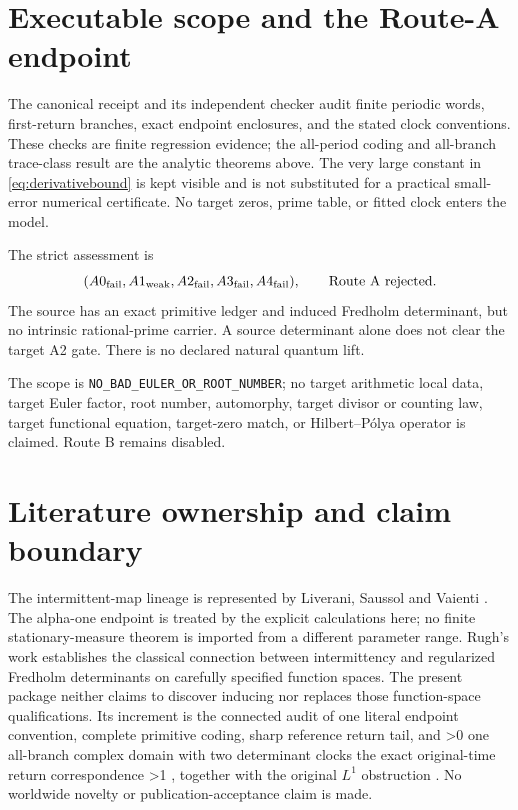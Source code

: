 \documentclass[10pt]{article}
\begin{document}
\section{Executable scope and the Route-A endpoint}
The canonical receipt and its independent checker audit finite periodic
words, first-return branches, exact endpoint enclosures, and the stated
clock conventions. These checks are finite regression evidence; the
all-period coding and all-branch trace-class result are the analytic
theorems above. The very large constant in \eqref{eq:derivativebound} is
kept visible and is not substituted for a practical small-error numerical
certificate. No target zeros, prime table, or fitted clock enters the model.

The strict assessment is
\begin{equation}
(A0_{\rm fail},A1_{\rm weak},A2_{\rm fail},A3_{\rm fail},A4_{\rm fail}),
\qquad\text{Route A rejected}.
\label{eq:route}
\end{equation}
The source has an exact primitive ledger and induced Fredholm determinant,
but no intrinsic rational-prime carrier. A source determinant alone does
not clear the target A2 gate. There is no declared natural quantum lift.

\begin{samepage}
The scope is \texttt{NO\_BAD\_EULER\_OR\_ROOT\_NUMBER}; no target arithmetic
local data, target Euler factor, root number, automorphy, target divisor or
counting law, target functional equation, target-zero match, or
Hilbert--P\'olya operator is claimed. Route B remains disabled.
\end{samepage}
\fi

\section*{Literature ownership and claim boundary}
The intermittent-map lineage is represented by Liverani, Saussol and
Vaienti \cite{LSV}. The alpha-one endpoint is treated by the explicit
calculations here; no finite stationary-measure theorem is imported from a
different parameter range. Rugh's work \cite{Rugh} establishes the classical
connection between intermittency and regularized Fredholm determinants on
carefully specified function spaces. The present package neither claims to
discover inducing nor replaces those function-space qualifications.
Its increment is the connected audit of one literal endpoint convention,
complete primitive coding, sharp reference return tail, and
\ifnum\CRevisionRound>0
one all-branch complex domain with two determinant clocks
\else
the exact original-time return correspondence
\fi
\ifnum\CRevisionRound>1
\unskip, together with the original $L^1$ obstruction
\fi
\unskip. No worldwide novelty or publication-acceptance claim is made.
\end{document}

